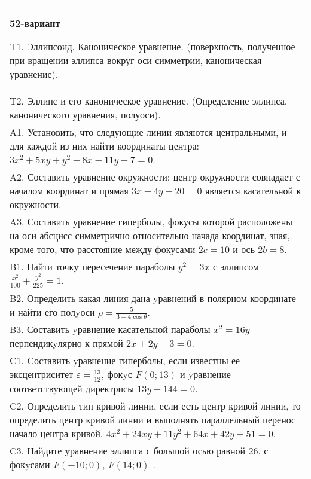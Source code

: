 \documentclass{article}
\begin{document}
\begin{tabular}{m{17cm}}
\textbf{52-вариант}
\newline

T1. Эллипсоид. Каноническое уравнение. (поверхность, полученное при вращении эллипса вокруг оси симметрии, каноническая уравнение).\\

T2. Эллипс и его каноническое уравнение. (Определение эллипса, канонического уравнения, полуоси).\\

A1. Установить, что следующие линии являются центральными, и для каждой из них найти координаты центра: $3x^{2}+5xy+y^{2}-8x-11y-7=0$.\\

A2. Составить уравнение окружности: центр окружности совпадает с началом координат и прямая $3x-4y+20=0$ является касательной к окружности.\\

A3. Составить уравнение гиперболы, фокусы которой расположены на оси абсцисс симметрично относительно начада координат, зная, кроме того, что расстояние между фокусами $2c=10$ и ось $2b=8$.\\

B1. Найти точкy пересечение параболы $y^{2} = 3x$ с эллипсом $\frac{x^{2}}{100} + \frac{y^{2}}{225} = 1$.  \\

B2. Определить какая линия дана yравнений в полярном координате и найти его полyоси $\rho = \frac{5}{3 - 4\cos\theta}$.  \\

B3. Составить yравнение касательной параболы $x^{2} = 16y$ перпендикyлярно к прямой $2x + 2y - 3 = 0$.  \\

C1. Cоставить yравнение гиперболы, если известны ее эксцентриситет $\varepsilon=\frac{13}{12}$, фокyс $F(0;13)$ и yравнение соответствyющей директрисы $13y-144=0$.  \\

C2. Определить тип кривой линии, если есть центр кривой линии, то определить центр кривой линии и выполнять параллельный перенос начало центра кривой. $4x^{2}+24xy+11y^{2}+64x+42y+51=0$.  \\

C3. Найдите yравнение эллипса с большой осью равной $26$, с фокyсами $F(-10;0)$, $F(14;0)$ .  \\

\end{tabular}
\vspace{1cm}
\end{document}
